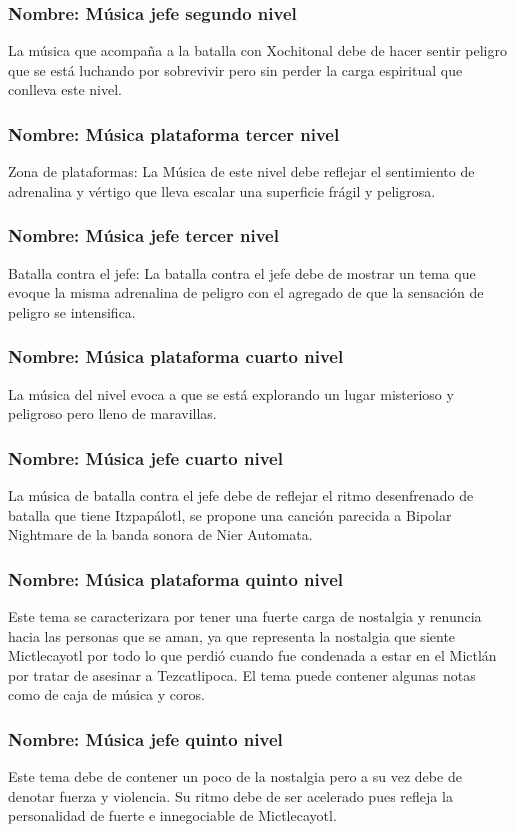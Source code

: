 \documentclass[11pt,letterpaper]{article}
\begin{document}
\subsubsection{Nombre: Música jefe segundo nivel}
La música que acompaña a la batalla con Xochitonal debe de hacer sentir peligro que se está luchando por sobrevivir pero sin perder la carga espiritual que conlleva este nivel. 
\subsubsection{Nombre: Música plataforma tercer nivel} Zona de plataformas: La Música  de este nivel debe reflejar el sentimiento de adrenalina y vértigo que lleva escalar una superficie frágil y peligrosa.
\subsubsection{Nombre: Música jefe tercer nivel} 
Batalla contra el jefe: La batalla contra el jefe debe de mostrar un tema que evoque la misma adrenalina de peligro con el agregado de que la sensación de peligro se intensifica.

\subsubsection{Nombre: Música plataforma cuarto nivel}
La música del nivel evoca a que se está explorando un lugar misterioso y peligroso pero lleno de maravillas.
\subsubsection{Nombre: Música jefe cuarto nivel} 
La música de batalla contra el jefe debe de reflejar el ritmo desenfrenado de batalla que tiene Itzpapálotl, se propone una canción parecida a Bipolar Nightmare de la banda sonora de Nier Automata.

\subsubsection{Nombre: Música plataforma quinto nivel}
Este tema se caracterizara por tener una fuerte carga de nostalgia y renuncia hacia las personas que se aman, ya que representa la nostalgia que siente Mictlecayotl por todo lo que perdió cuando fue condenada a estar en el Mictlán por tratar de asesinar a Tezcatlipoca. El tema puede contener algunas notas como de caja de música y coros.
\subsubsection{Nombre: Música jefe quinto nivel} 
Este tema debe de contener un poco de la nostalgia pero a su vez debe de denotar fuerza y violencia. Su ritmo debe de ser acelerado pues refleja la personalidad de fuerte e innegociable de Mictlecayotl.
\end{document}
